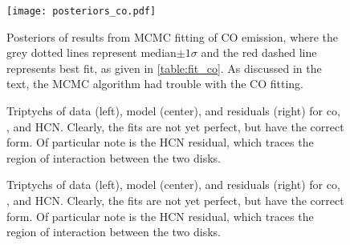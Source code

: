 \begin{figure}%
  \hspace*{\fill}%
  \texttt{[image: posteriors\_co.pdf]}\hfill%
  \hspace*{\fill}%
  \caption{Posteriors of results from MCMC fitting of CO emission, where the grey dotted lines represent median$\pm 1\sigma$ and the red dashed line represents best fit, as given in \ref{table:fit_co}. As discussed in the text, the MCMC algorithm had trouble with the CO fitting.}
  \label{fig:co_posteriors}
\end{figure}





\begin{figure}%
  \centering
    \hspace*{\fill}%
    \vfill%
    \vfill%
    \hspace*{\fill}%
    \caption{Triptychs of data (left), model (center), and residuals (right) for co, \hco, and HCN. Clearly, the fits are not yet perfect, but have the correct form. Of particular note is the HCN residual, which traces the region of interaction between the two disks.}
    \label{fig:dmr_moment_maps}
\end{figure}





\begin{figure}%
  \centering
    \hspace*{\fill}%
    \vfill%
    \vfill%
    \hspace*{\fill}%
    \caption{Triptychs of data (left), model (center), and residuals (right) for co, \hco, and HCN. Clearly, the fits are not yet perfect, but have the correct form. Of particular note is the HCN residual, which traces the region of interaction between the two disks.}
    \label{fig:dmr_moment_maps}
\end{figure}






